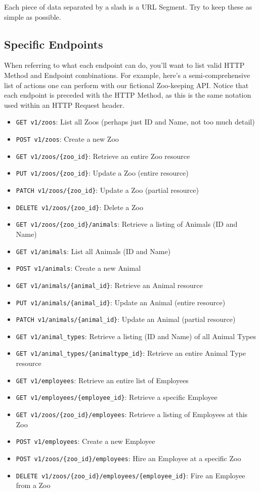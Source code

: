 \documentclass{book}
\begin{document}
Each piece of data separated by a slash is a URL Segment. Try to keep these as simple as possible.

\subsection{Specific Endpoints}

When referring to what each endpoint can do, you'll want to list valid HTTP Method and Endpoint combinations. For example, here's a semi-comprehensive list of actions one can perform with our fictional Zoo-keeping API. Notice that each endpoint is preceded with the HTTP Method, as this is the same notation used within an HTTP Request header.

\begin{itemize}
\item \texttt{GET v1/zoos}: List all Zoos (perhaps just ID and Name, not too much detail)
\item \texttt{POST v1/zoos}: Create a new Zoo
\item \texttt{GET v1/zoos/\{zoo\_id\}}: Retrieve an entire Zoo resource
\item \texttt{PUT v1/zoos/\{zoo\_id\}}: Update a Zoo (entire resource)
\item \texttt{PATCH v1/zoos/\{zoo\_id\}}: Update a Zoo (partial resource)
\item \texttt{DELETE v1/zoos/\{zoo\_id\}}: Delete a Zoo
\item \texttt{GET v1/zoos/\{zoo\_id\}/animals}: Retrieve a listing of Animals (ID and Name)
\item \texttt{GET v1/animals}: List all Animals (ID and Name)
\item \texttt{POST v1/animals}: Create a new Animal
\item \texttt{GET v1/animals/\{animal\_id\}}: Retrieve an Animal resource
\item \texttt{PUT v1/animals/\{animal\_id\}}: Update an Animal (entire resource)
\item \texttt{PATCH v1/animals/\{animal\_id\}}: Update an Animal (partial resource)
\item \texttt{GET v1/animal\_types}: Retrieve a listing (ID and Name) of all Animal Types
\item \texttt{GET v1/animal\_types/\{animaltype\_id\}}: Retrieve an entire Animal Type resource
\item \texttt{GET v1/employees}: Retrieve an entire list of Employees
\item \texttt{GET v1/employees/\{employee\_id\}}: Retrieve a specific Employee
\item \texttt{GET v1/zoos/\{zoo\_id\}/employees}: Retrieve a listing of Employees at this Zoo
\item \texttt{POST v1/employees}: Create a new Employee
\item \texttt{POST v1/zoos/\{zoo\_id\}/employees}: Hire an Employee at a specific Zoo
\item \texttt{DELETE v1/zoos/\{zoo\_id\}/employees/\{employee\_id\}}: Fire an Employee from a Zoo
\end{itemize}
\end{document}
